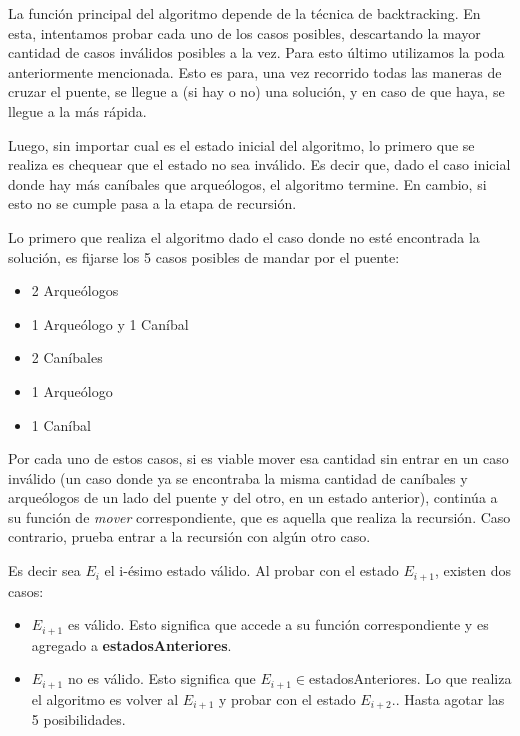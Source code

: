       \par La función principal del algoritmo depende de la técnica de backtracking. En esta, intentamos probar cada uno de los casos posibles, descartando la mayor cantidad de casos inválidos posibles a la vez. Para esto último utilizamos la poda anteriormente mencionada. Esto es para, una vez recorrido todas las maneras de cruzar el puente, se llegue a (si hay o no) una solución, y en caso de que haya, se llegue a la más rápida.

      \par Luego, sin importar cual es el estado inicial del algoritmo, lo primero que se realiza es chequear que el estado no sea inválido. Es decir que, dado el caso inicial donde hay más caníbales que arqueólogos, el algoritmo termine. En cambio, si esto no se cumple pasa a la etapa de recursión. 

      \par Lo primero que realiza el algoritmo dado el caso donde no esté encontrada la solución, es fijarse los 5 casos posibles de mandar por el puente:

      \begin{itemize}
      	\item 2 Arqueólogos
      	\item 1 Arqueólogo y 1 Caníbal
      	\item 2 Caníbales
      	\item 1 Arqueólogo
      	\item 1 Caníbal
      \end{itemize}

       Por cada uno de estos casos, si es viable mover esa cantidad sin entrar en un caso inválido (un caso donde ya se encontraba la misma cantidad de caníbales y arqueólogos de un lado del puente y del otro, en un estado anterior), continúa a su función de \emph{mover} correspondiente, que es aquella que realiza la recursión. Caso contrario, prueba entrar a la recursión con algún otro caso. 

       Es decir sea $E_{i}$ el i-ésimo estado válido. Al probar con el estado $E_{i+1}$, existen dos casos:

       \begin{itemize}
       	\item $E_{i+1}$ es válido. Esto significa que accede a su función correspondiente y es agregado a \textbf{estadosAnteriores}.
       	\item $E_{i+1}$ no es válido. Esto significa que $E_{i+1} \in$estadosAnteriores. Lo que realiza el algoritmo es volver al $E_{i+1}$ y probar con el estado $E_{i+2}$.. Hasta agotar las 5 posibilidades.
       \end{itemize}

